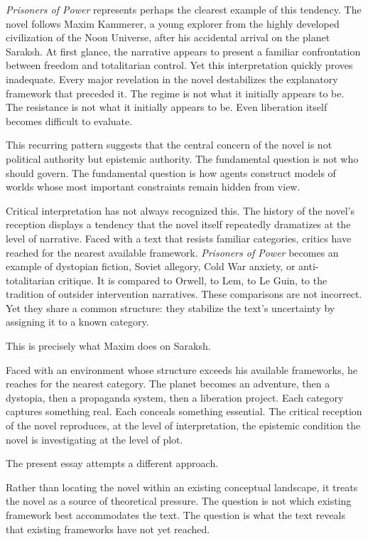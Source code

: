 \documentclass[12pt, a4paper]{article}
\theoremstyle{plain}
\theoremstyle{definition}
\theoremstyle{remark}
\begin{document}
\textit{Prisoners of Power} represents perhaps the clearest
example of this tendency. The novel follows Maxim Kammerer,
a young explorer from the highly developed civilization
of the Noon Universe, after his accidental arrival on
the planet Saraksh. At first glance, the narrative appears
to present a familiar confrontation between freedom and
totalitarian control. Yet this interpretation quickly
proves inadequate. Every major revelation in the novel
destabilizes the explanatory framework that preceded it.
The regime is not what it initially appears to be. The
resistance is not what it initially appears to be. Even
liberation itself becomes difficult to evaluate.

This recurring pattern suggests that the central concern
of the novel is not political authority but epistemic
authority. The fundamental question is not who should
govern. The fundamental question is how agents construct
models of worlds whose most important constraints remain
hidden from view.

Critical interpretation has not always recognized this.
The history of the novel's reception displays a tendency
that the novel itself repeatedly dramatizes at the level
of narrative. Faced with a text that resists familiar
categories, critics have reached for the nearest available
framework. \textit{Prisoners of Power} becomes an example
of dystopian fiction, Soviet allegory, Cold War anxiety,
or anti-totalitarian critique. It is compared to Orwell,
to Lem, to Le Guin, to the tradition of outsider
intervention narratives. These comparisons are not
incorrect. Yet they share a common structure: they
stabilize the text's uncertainty by assigning it to
a known category.

This is precisely what Maxim does on Saraksh.

Faced with an environment whose structure exceeds his
available frameworks, he reaches for the nearest category.
The planet becomes an adventure, then a dystopia, then
a propaganda system, then a liberation project. Each
category captures something real. Each conceals something
essential. The critical reception of the novel reproduces,
at the level of interpretation, the epistemic condition
the novel is investigating at the level of plot.

The present essay attempts a different approach.

Rather than locating the novel within an existing
conceptual landscape, it treats the novel as a source
of theoretical pressure. The question is not which
existing framework best accommodates the text. The
question is what the text reveals that existing frameworks
have not yet reached.
\end{document}
